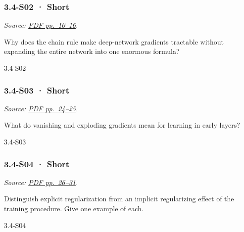 \noindent\begin{minipage}{\linewidth}

\subsubsection{3.4-S02 · Short}\label{s02-short-10}

\emph{Source:
\href{../Lecture\%20Slides/3.4.\%20Deep\%20Learning\%20Fundamentals\%20II.pdf\#page=10}{PDF
pp.~10--16}.}

Why does the chain rule make deep-network gradients tractable without
expanding the entire network into one enormous formula?

\begin{solution}[20mm]{3.4-S02}

\end{solution}
\end{minipage}\par\medskip

\noindent\begin{minipage}{\linewidth}

\subsubsection{3.4-S03 · Short}\label{s03-short-10}

\emph{Source:
\href{../Lecture\%20Slides/3.4.\%20Deep\%20Learning\%20Fundamentals\%20II.pdf\#page=24}{PDF
pp.~24--25}.}

What do vanishing and exploding gradients mean for learning in early
layers?

\begin{solution}[20mm]{3.4-S03}

\end{solution}
\end{minipage}\par\medskip

\noindent\begin{minipage}{\linewidth}

\subsubsection{3.4-S04 · Short}\label{s04-short-10}

\emph{Source:
\href{../Lecture\%20Slides/3.4.\%20Deep\%20Learning\%20Fundamentals\%20II.pdf\#page=26}{PDF
pp.~26--31}.}

Distinguish explicit regularization from an implicit regularizing effect
of the training procedure. Give one example of each.

\begin{solution}[20mm]{3.4-S04}

\end{solution}
\end{minipage}\par\medskip


